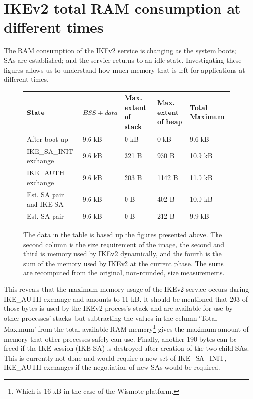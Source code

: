 \documentclass[final,a4paper,twoside,11pt,onecolumn]{report}
\begin{document}

\section{IKEv2 total RAM consumption at different times}
\label{sec:eval-sum}
The RAM consumption of the IKEv2 service is changing as the system boots; SAs are established; and the service returns to an idle state. Investigating these figures allows us to understand how much memory that is left for applications at different times.

\begin{figure}[h]
\centering
\begin{tabular}{ p{2.25cm} | l | p{2.25cm} | p{2.25cm} | p{2.25cm} }                        
State                   & $BSS + data$ & Max. extent of stack  & Max. extent of heap   & Total Maximum  \\ \hline
After boot up           & 9.6 kB       & 0 kB                  & 0 kB                  & 9.6 kB       \\
IKE\_SA\_INIT exchange  & 9.6 kB       & 321 B                 & 930 B                 & 10.9 kB      \\
IKE\_AUTH exchange      & 9.6 kB       & 203 B                 & 1142 B                & 11.0 kB      \\
Est. SA pair and IKE-SA & 9.6 kB       & 0 B                   & 402 B                 & 10.0 kB      \\
Est. SA pair            & 9.6 kB       & 0 B                   & 212 B                 & 9.9 kB
\end{tabular}
\caption{The data in the table is based up the figures presented above. The second column is the size requirement of the image, the second and third is memory used by IKEv2 dynamically, and the fourth is the sum of the memory used by IKEv2 at the current phase. The sums are recomputed from the original, non-rounded, size measurements.}
\end{figure}

This reveals that the maximum memory usage of the IKEv2 service occurs during IKE\_AUTH exchange and amounts to 11 kB. It should be mentioned that 203 of those bytes is used by the IKEv2 process's stack and are available for use by other processes' stacks, but subtracting the values in the column `Total Maximum' from the total available RAM memory\footnote{Which is 16 kB in the case of the Wismote platform.} gives the maximum amount of memory that other processes safely can use. Finally, another 190 bytes can be freed if the IKE session (IKE SA) is destroyed after creation of the two child SAs. This is currently not done and would require a new set of IKE\_SA\_INIT, IKE\_AUTH exchanges if the negotiation of new SAs would be required.  
\end{document}
